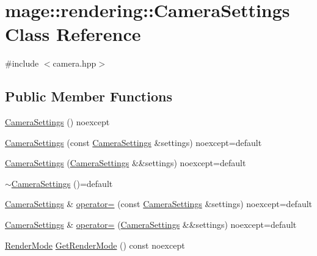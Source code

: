\hypertarget{classmage_1_1rendering_1_1_camera_settings}{}\section{mage\+:\+:rendering\+:\+:Camera\+Settings Class Reference}
\label{classmage_1_1rendering_1_1_camera_settings}


{\ttfamily \#include $<$camera.\+hpp$>$}

\subsection*{Public Member Functions}
\begin{DoxyCompactItemize}
\item 
\mbox{\hyperlink{classmage_1_1rendering_1_1_camera_settings_a46be4ca54bacf2597672a2e944f9fef6}{Camera\+Settings}} () noexcept
\item 
\mbox{\hyperlink{classmage_1_1rendering_1_1_camera_settings_af0501d9365b74ce296a517b40a13e81e}{Camera\+Settings}} (const \mbox{\hyperlink{classmage_1_1rendering_1_1_camera_settings}{Camera\+Settings}} \&settings) noexcept=default
\item 
\mbox{\hyperlink{classmage_1_1rendering_1_1_camera_settings_a08e6d9c319feb6af0c14f4d057220da8}{Camera\+Settings}} (\mbox{\hyperlink{classmage_1_1rendering_1_1_camera_settings}{Camera\+Settings}} \&\&settings) noexcept=default
\item 
\mbox{\hyperlink{classmage_1_1rendering_1_1_camera_settings_a0e5badc4e959b8ddad0d7df2da4c934f}{$\sim$\+Camera\+Settings}} ()=default
\item 
\mbox{\hyperlink{classmage_1_1rendering_1_1_camera_settings}{Camera\+Settings}} \& \mbox{\hyperlink{classmage_1_1rendering_1_1_camera_settings_a8cc59c883ea4c45a6bb7e9dc728856fd}{operator=}} (const \mbox{\hyperlink{classmage_1_1rendering_1_1_camera_settings}{Camera\+Settings}} \&settings) noexcept=default
\item 
\mbox{\hyperlink{classmage_1_1rendering_1_1_camera_settings}{Camera\+Settings}} \& \mbox{\hyperlink{classmage_1_1rendering_1_1_camera_settings_a28ae670d467adfc74ef8929f24b2e615}{operator=}} (\mbox{\hyperlink{classmage_1_1rendering_1_1_camera_settings}{Camera\+Settings}} \&\&settings) noexcept=default
\item 
\mbox{\hyperlink{namespacemage_1_1rendering_aeb14ce7610cc9391f4e01be027b91dcc}{Render\+Mode}} \mbox{\hyperlink{classmage_1_1rendering_1_1_camera_settings_ab1421b9c47b7eafbebd0619c5b5116b5}{Get\+Render\+Mode}} () const noexcept

\end{DoxyCompactItemize}
